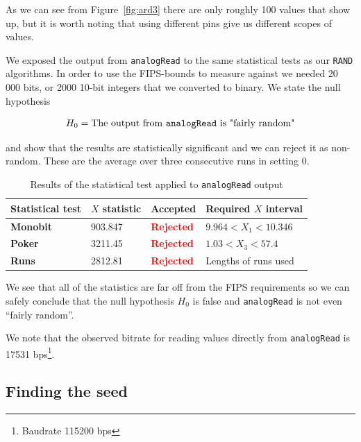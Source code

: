\documentclass[a4paper]{article}           %
\begin{document}
As we can see from Figure~\ref{fig:ard3} there are only roughly 100 values that show up, but it is worth noting that using different pins give us different scopes of values. 

We exposed the output from \texttt{analogRead} to the same statistical tests as our \texttt{RAND} algorithms. In order to use the FIPS-bounds to measure against we needed 20 000 bits, or 2000 10-bit integers that we converted to binary. We state the null hypothesis

\[
H_0 = \text{The output from \texttt{analogRead} is "fairly random"}
\]

and show that the results are statistically significant and we can reject it as non-random. These are the average over three consecutive runs in setting 0. 

  \begin{table}[H]
    \begin{center}
      \begin{tabular}{| l | l | l | l |}
        \hline
        Statistical test & $X$ statistic & Accepted & Required $X$ interval \\
        \hline
        \hline
        \textbf{Monobit} & 903.847 & \textcolor{red}{\textbf{Rejected}} & $9.964 < X_1 < 10.346$  \\
        \textbf{Poker} & 3211.45 & \textcolor{red}{\textbf{Rejected}} & $1.03 < X_3 < 57.4$ \\
        \textbf{Runs} & 2812.81 & \textcolor{red}{\textbf{Rejected}} & Lengths of runs used \\
        \hline
      \end{tabular}
    \end{center}
    \caption{Results of the statistical test applied to \texttt{analogRead} output}
    \label{tab:analogreadtests}
  \end{table}

We see that all of the statistics are far off from the FIPS requirements so we can safely conclude that the null hypothesis $H_0$ is false and \texttt{analogRead} is not even ``fairly random''. 

We note that the observed bitrate for reading values directly from \texttt{analogRead} is 17531 bps\footnote{Baudrate 115200 bps}. 

\subsection{Finding the seed}
\label{sec:seedfind}
\end{document}
